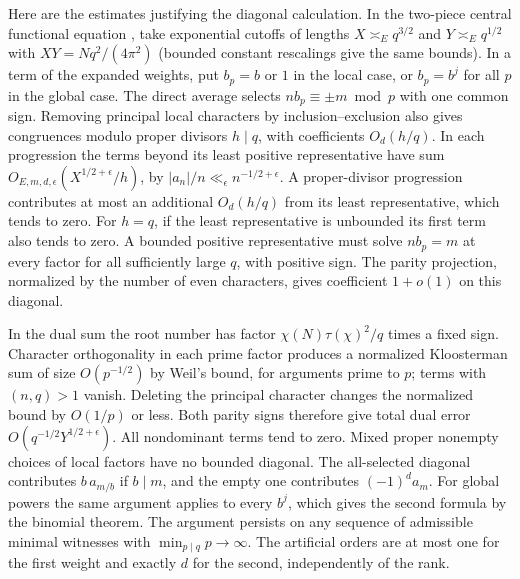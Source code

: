 \documentclass[11pt]{article}
\begin{document}
Here are the estimates justifying the diagonal calculation. In the two-piece central functional equation \cite{Akbary}, take exponential cutoffs of lengths $X\asymp_E q^{3/2}$ and $Y\asymp_E q^{1/2}$ with $XY=Nq^2/(4\pi^2)$ (bounded constant rescalings give the same bounds). In a term of the expanded weights, put $b_p=b$ or $1$ in the local case, or $b_p=b^j$ for all $p$ in the global case. The direct average selects $n b_p\equiv \pm m\bmod p$ with one common sign. Removing principal local characters by inclusion--exclusion also gives congruences modulo proper divisors $h\mid q$, with coefficients $O_d(h/q)$. In each progression the terms beyond its least positive representative have sum $O_{E,m,d,\epsilon}(X^{1/2+\epsilon}/h)$, by $|a_n|/n\ll_\epsilon n^{-1/2+\epsilon}$. A proper-divisor progression contributes at most an additional $O_d(h/q)$ from its least representative, which tends to zero. For $h=q$, if the least representative is unbounded its first term also tends to zero. A bounded positive representative must solve $n b_p=m$ at every factor for all sufficiently large $q$, with positive sign. The parity projection, normalized by the number of even characters, gives coefficient $1+o(1)$ on this diagonal.

In the dual sum the root number has factor $\chi(N)\tau(\chi)^2/q$ times a fixed sign. Character orthogonality in each prime factor produces a normalized Kloosterman sum of size $O(p^{-1/2})$ by Weil's bound, for arguments prime to $p$; terms with $(n,q)>1$ vanish. Deleting the principal character changes the normalized bound by $O(1/p)$ or less. Both parity signs therefore give total dual error $O(q^{-1/2}Y^{1/2+\epsilon})$. All nondominant terms tend to zero. Mixed proper nonempty choices of local factors have no bounded diagonal. The all-selected diagonal contributes $b\,a_{m/b}$ if $b\mid m$, and the empty one contributes $(-1)^d a_m$. For global powers the same argument applies to every $b^j$, which gives the second formula by the binomial theorem. The argument persists on any sequence of admissible minimal witnesses with $\min_{p\mid q}p\to\infty$. The artificial orders are at most one for the first weight and exactly $d$ for the second, independently of the rank.
\end{document}
